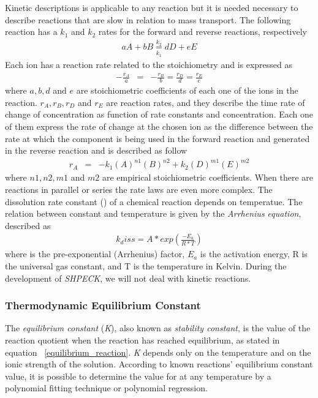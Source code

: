 \documentclass[ppgc,mestrado,english]{iiufrgs}
\begin{document}
Kinetic descriptions is applicable to any reaction but it is needed necessary to describe  reactions that are slow in relation to mass transport.  The following reaction has a $k_1$ and $k_2$ rates for the forward and reverse reactions, respectively 
\begin{eqnarray}
aA + bB \underset{k_1}{\overset{k_2}{=}} dD + eE 
\end{eqnarray}
Each ion has a reaction rate related to the stoichiometry and is expressed as
\begin{eqnarray}
-\frac{r_A}{a} &=& -\frac{r_B}{b} = \frac{r_D}{d} = \frac{r_E}{e}
\end{eqnarray}
where $a, b, d$ and $e$ are stoichiometric coefficients of each one of the ions in the reaction. $r_A, r_B, r_D$ and $r_E$ are reaction rates, and they describe the time rate of change of concentration as function of rate constants and concentration. Each one of them express the rate of change at the chosen ion as the difference between the rate at which the component is being used in the forward reaction and generated in the reverse reaction and is described as follow
\begin{eqnarray}
r_A &=& - k_1 (A)^{n1}(B)^{n2} + k_2 (D)^{m1}(E)^{m2}
\end{eqnarray}
where $n1, n2, m1$ and $m2$ are empirical stoichiometric coefficients. When there are reactions in parallel or series the rate laws are even more complex.
The dissolution rate constant () of a chemical reaction depends on temperatue. The relation between constant and temperature is given by the \emph{Arrhenius equation}, described as
\begin{eqnarray}
k_diss = A * exp(\frac{-E_a}{R*T})
\end{eqnarray}
where  is the pre-exponential (Arrhenius) factor, $E_a$ is the activation energy, R is the universal gas constant, and T is the temperature in Kelvin.
During the development of \emph{SHPECK}, we will not deal with kinetic reactions.

\subsubsection{Thermodynamic Equilibrium Constant}
The \emph{equilibrium constant} (\emph{K}), also known as \emph{stability constant}, is the value of the reaction quotient when the reaction has reached equilibrium, as stated in equation ~\ref{equilibrium_reaction}. \emph{K} depends only on the temperature and on the ionic strength of the solution. According to known reactions' equilibrium constant value, it is possible to determine the value for at any temperature by a polynomial fitting technique or polynomial regression.
\end{document}

